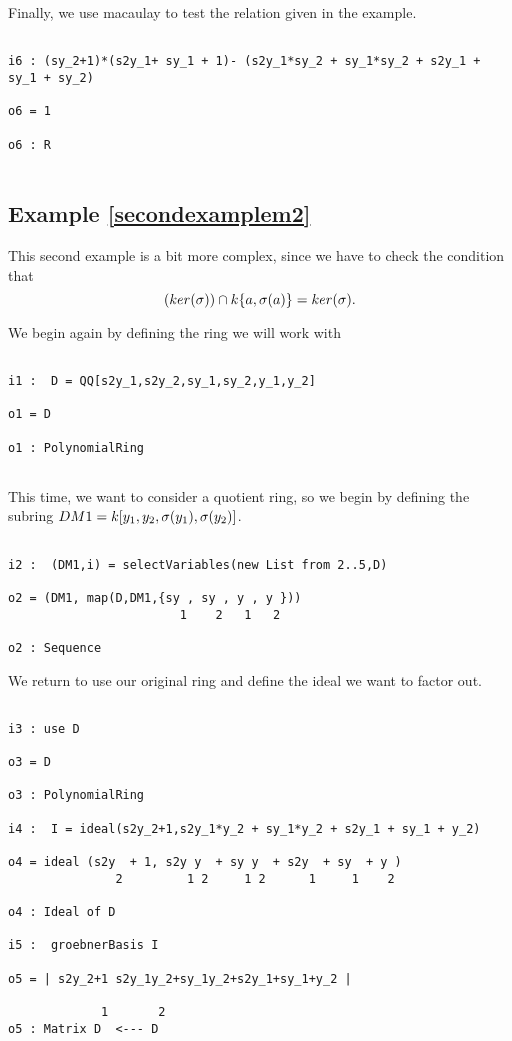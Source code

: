Finally, we use macaulay to test the relation given in the example.

\begin{lstlisting}

i6 : (sy_2+1)*(s2y_1+ sy_1 + 1)- (s2y_1*sy_2 + sy_1*sy_2 + s2y_1 + sy_1 + sy_2)

o6 = 1

o6 : R


\end{lstlisting}

\subsection{Example \ref{secondexamplem2}}

This second example is a bit more complex, since we have to check the condition that
$$(ker(\sigma)) \cap k\{a,\sigma(a)\} = ker(\sigma).$$

We begin again by defining the ring we will work with

\begin{lstlisting}

i1 :  D = QQ[s2y_1,s2y_2,sy_1,sy_2,y_1,y_2]

o1 = D

o1 : PolynomialRing


\end{lstlisting}

This time, we want to consider a quotient ring, so we begin by defining the subring $DM1 = k[y_1,y_2,\sigma(y_1),\sigma(y_2)]$.

\begin{lstlisting}

i2 :  (DM1,i) = selectVariables(new List from 2..5,D)

o2 = (DM1, map(D,DM1,{sy , sy , y , y }))
                        1    2   1   2

o2 : Sequence

\end{lstlisting}

We return to use our original ring and define the ideal we want to factor out.

\begin{lstlisting}

i3 : use D

o3 = D

o3 : PolynomialRing

i4 :  I = ideal(s2y_2+1,s2y_1*y_2 + sy_1*y_2 + s2y_1 + sy_1 + y_2)

o4 = ideal (s2y  + 1, s2y y  + sy y  + s2y  + sy  + y )
               2         1 2     1 2      1     1    2

o4 : Ideal of D

i5 :  groebnerBasis I

o5 = | s2y_2+1 s2y_1y_2+sy_1y_2+s2y_1+sy_1+y_2 |

             1       2
o5 : Matrix D  <--- D


\end{lstlisting}

